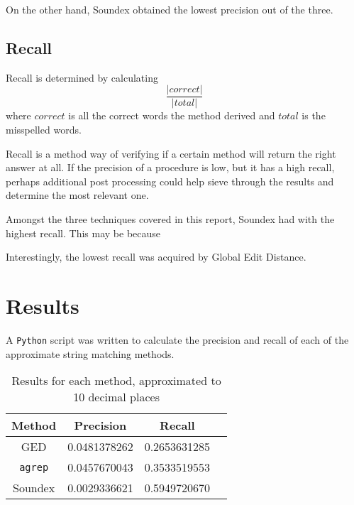 \documentclass[11pt]{article}
\begin{document}
On the other hand, Soundex obtained the lowest precision out of the three. %

\subsection{Recall}
Recall is determined by calculating 
\begin{equation}\frac{|correct|}{|total|}\end{equation}
where \(correct\) is all the correct words the method derived and \(total\) is the misspelled words. 

Recall is a method way of verifying if a certain method will return the right answer at all. If the precision of a procedure is low, but it has a high recall, perhaps additional post processing could help sieve through the results and determine the most relevant one. 


Amongst the three techniques covered in this report, Soundex had with the highest recall. This may be because 

Interestingly, the lowest recall was acquired by Global Edit Distance. %

\section{Results}

A \texttt{Python} script was written to calculate the precision and recall of each of the approximate string matching methods.

\begin{table}[h]
 \begin{center}
\begin{tabular}{|c||c|c|c|}

\hline
Method & Precision & Recall \\
\hline\hline
GED & 0.0481378262 & 0.2653631285 \\ 
\texttt{agrep} & 0.0457670043 & 0.3533519553 \\ 
Soundex & 0.0029336621 & 0.5949720670 \\
\hline

\end{tabular}
\caption{Results for each method, approximated to 10 decimal places}\label{table1}
 \end{center}
\end{table}
\end{document}
